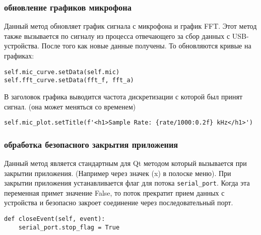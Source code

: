 \documentclass[../main.tex]{subfiles}
\begin{document}
\subsubsection{обновление графиков микрофона}
Данный метод обновляет график сигнала с микрофона и график FFT. Этот метод также вызывается по сигналу из процесса отвечающего за сбор данных с USB-устройства. После того как новые данные получены. То обновляются кривые на графиках:

\begin{lstlisting}
self.mic_curve.setData(self.mic)
self.fft_curve.setData(fft_f, fft_a)
\end{lstlisting}

В заголовок графика выводится частота дискретизации с которой был принят сигнал. (она может меняться со временем)
\begin{lstlisting}
self.mic_plot.setTitle(f'<h1>Sample Rate: {rate/1000:0.2f} kHz</h1>')
\end{lstlisting}

\subsubsection{обработка безопасного закрытия приложения}
Данный метод является стандартным для Qt методом который вызывается при закрытии приложения. (Например через значек (x) в полоске меню). При закрытии приложения устанавливается флаг для потока \verb|serial_port|. Когда эта переменная примет значение False, то поток прекратит прием данных с устройства и безопасно закроет соединение через последовательный порт.

\begin{lstlisting}
def closeEvent(self, event):
    serial_port.stop_flag = True
\end{lstlisting}




\newpage
\end{document}
